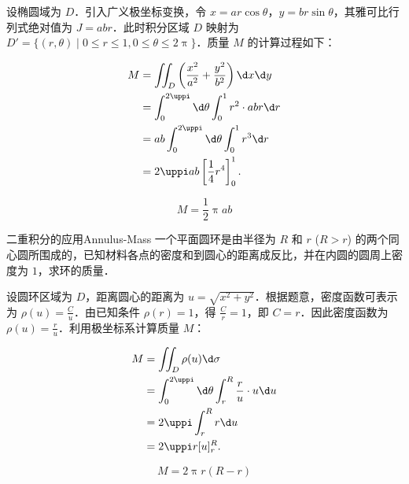 \begin{solution}
    设椭圆域为 $D$．引入广义极坐标变换，令 $x = ar \cos \theta$，$y = br \sin \theta$，其雅可比行列式绝对值为 $J = abr$．此时积分区域 $D$ 映射为 $D' = \{(r, \theta) \mid 0 \leqslant r \leqslant 1, 0 \leqslant \theta \leqslant 2\uppi\}$．质量 $M$ 的计算过程如下：

    \begin{equation}
        \begin{aligned}
            M & = \iint_{D} \left( \frac{x^2}{a^2} + \frac{y^2}{b^2} \right) \d x \d y \\
              & = \int_{0}^{2\uppi} \d \theta \int_{0}^{1} r^2 \cdot abr \d r          \\
              & = ab \int_{0}^{2\uppi} \d \theta \int_{0}^{1} r^3 \d r                 \\
              & = 2\uppi ab \left[ \frac{1}{4} r^4 \right]_{0}^{1} .
        \end{aligned}
    \end{equation}

    \begin{equation}
        M = \boxed{\frac{1}{2} \uppi ab}
    \end{equation}
\end{solution}

\begin{problem}{二重积分的应用}{Annulus-Mass}
    一个平面圆环是由半径为 $R$ 和 $r$ ($R > r$) 的两个同心圆所围成的，已知材料各点的密度和到圆心的距离成反比，并在内圆的圆周上密度为 $1$，求环的质量．
\end{problem}

\begin{solution}
    设圆环区域为 $D$，距离圆心的距离为 $u = \sqrt{x^2 + y^2}$．根据题意，密度函数可表示为 $\rho(u) = \frac{C}{u}$．由已知条件 $\rho(r) = 1$，得 $\frac{C}{r} = 1$，即 $C = r$．因此密度函数为 $\rho(u) = \frac{r}{u}$．利用极坐标系计算质量 $M$：

    \begin{equation}
        \begin{aligned}
            M & = \iint_{D} \rho(u) \d \sigma                                       \\
              & = \int_{0}^{2\uppi} \d \theta \int_{r}^{R} \frac{r}{u} \cdot u \d u \\
              & = 2\uppi \int_{r}^{R} r \d u                                        \\
              & = 2\uppi r [u]_{r}^{R} .
        \end{aligned}
    \end{equation}

    \begin{equation}
        M = \boxed{2\uppi r (R - r)}
    \end{equation}
\end{solution}

